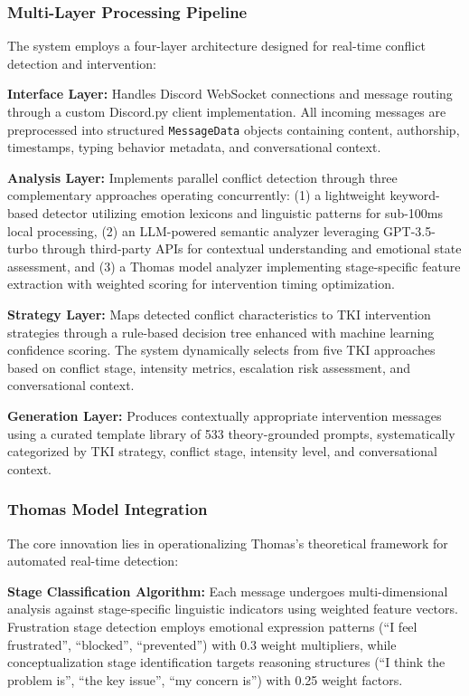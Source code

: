 \documentclass[12pt,a4paper]{article}
\begin{document}
\subsubsection{Multi-Layer Processing Pipeline}
The system employs a four-layer architecture designed for real-time conflict detection and intervention:

\textbf{Interface Layer:} Handles Discord WebSocket connections and message routing through a custom Discord.py client implementation. All incoming messages are preprocessed into structured \texttt{MessageData} objects containing content, authorship, timestamps, typing behavior metadata, and conversational context.

\textbf{Analysis Layer:} Implements parallel conflict detection through three complementary approaches operating concurrently: (1) a lightweight keyword-based detector utilizing emotion lexicons and linguistic patterns for sub-100ms local processing, (2) an LLM-powered semantic analyzer leveraging GPT-3.5-turbo through third-party APIs for contextual understanding and emotional state assessment, and (3) a Thomas model analyzer implementing stage-specific feature extraction with weighted scoring for intervention timing optimization.

\textbf{Strategy Layer:} Maps detected conflict characteristics to TKI intervention strategies through a rule-based decision tree enhanced with machine learning confidence scoring. The system dynamically selects from five TKI approaches based on conflict stage, intensity metrics, escalation risk assessment, and conversational context.

\textbf{Generation Layer:} Produces contextually appropriate intervention messages using a curated template library of 533 theory-grounded prompts, systematically categorized by TKI strategy, conflict stage, intensity level, and conversational context.

\subsubsection{Thomas Model Integration}
The core innovation lies in operationalizing Thomas's theoretical framework for automated real-time detection:

\textbf{Stage Classification Algorithm:} Each message undergoes multi-dimensional analysis against stage-specific linguistic indicators using weighted feature vectors. Frustration stage detection employs emotional expression patterns (``I feel frustrated'', ``blocked'', ``prevented'') with 0.3 weight multipliers, while conceptualization stage identification targets reasoning structures (``I think the problem is'', ``the key issue'', ``my concern is'') with 0.25 weight factors.
\end{document}
